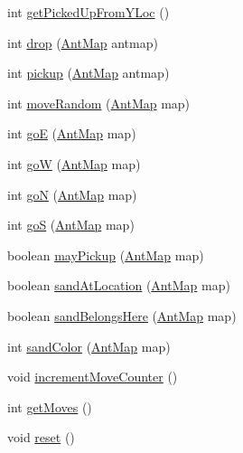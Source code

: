 \begin{DoxyCompactItemize}
\item 
int \hyperlink{classexamples_1_1gp_1_1painted_desert_1_1_ant_aca2e78e0b9846985835404ab3ad76653}{get\-Picked\-Up\-From\-Y\-Loc} ()
\item 
int \hyperlink{classexamples_1_1gp_1_1painted_desert_1_1_ant_aff7748f049d5da568009360f8d5aeb68}{drop} (\hyperlink{classexamples_1_1gp_1_1painted_desert_1_1_ant_map}{Ant\-Map} antmap)
\item 
int \hyperlink{classexamples_1_1gp_1_1painted_desert_1_1_ant_a7db26d98245bc1fb086981b00fe26a2f}{pickup} (\hyperlink{classexamples_1_1gp_1_1painted_desert_1_1_ant_map}{Ant\-Map} antmap)
\item 
int \hyperlink{classexamples_1_1gp_1_1painted_desert_1_1_ant_a489ccb7a59799176ab2ff45184f68092}{move\-Random} (\hyperlink{classexamples_1_1gp_1_1painted_desert_1_1_ant_map}{Ant\-Map} map)
\item 
int \hyperlink{classexamples_1_1gp_1_1painted_desert_1_1_ant_ad2991e6fb21e8cccca0725305ef2d894}{go\-E} (\hyperlink{classexamples_1_1gp_1_1painted_desert_1_1_ant_map}{Ant\-Map} map)
\item 
int \hyperlink{classexamples_1_1gp_1_1painted_desert_1_1_ant_a952dab60b5a44cd208b829c313c688e7}{go\-W} (\hyperlink{classexamples_1_1gp_1_1painted_desert_1_1_ant_map}{Ant\-Map} map)
\item 
int \hyperlink{classexamples_1_1gp_1_1painted_desert_1_1_ant_ab2b7be157d48b8a4386dfd9b69e54ffb}{go\-N} (\hyperlink{classexamples_1_1gp_1_1painted_desert_1_1_ant_map}{Ant\-Map} map)
\item 
int \hyperlink{classexamples_1_1gp_1_1painted_desert_1_1_ant_ab65017c2a36842a09bf2ceba456e4f8c}{go\-S} (\hyperlink{classexamples_1_1gp_1_1painted_desert_1_1_ant_map}{Ant\-Map} map)
\item 
boolean \hyperlink{classexamples_1_1gp_1_1painted_desert_1_1_ant_a76294c6abff2c657c487cf0983bdcbd0}{may\-Pickup} (\hyperlink{classexamples_1_1gp_1_1painted_desert_1_1_ant_map}{Ant\-Map} map)
\item 
boolean \hyperlink{classexamples_1_1gp_1_1painted_desert_1_1_ant_a625142e4f5abf2ea9cf1fc885535eb06}{sand\-At\-Location} (\hyperlink{classexamples_1_1gp_1_1painted_desert_1_1_ant_map}{Ant\-Map} map)
\item 
boolean \hyperlink{classexamples_1_1gp_1_1painted_desert_1_1_ant_afc482fddc69e6ab83316b320170437be}{sand\-Belongs\-Here} (\hyperlink{classexamples_1_1gp_1_1painted_desert_1_1_ant_map}{Ant\-Map} map)
\item 
int \hyperlink{classexamples_1_1gp_1_1painted_desert_1_1_ant_a7826f5f1c76c43b52658d1ae73e6979a}{sand\-Color} (\hyperlink{classexamples_1_1gp_1_1painted_desert_1_1_ant_map}{Ant\-Map} map)
\item 
void \hyperlink{classexamples_1_1gp_1_1painted_desert_1_1_ant_a581e31b5c0c8e96e02d9973cf0a01f4c}{increment\-Move\-Counter} ()
\item 
int \hyperlink{classexamples_1_1gp_1_1painted_desert_1_1_ant_a97e8bbcec25ff2da188e53678970f71e}{get\-Moves} ()
\item 
void \hyperlink{classexamples_1_1gp_1_1painted_desert_1_1_ant_a2a35feb4fa72fe85b685312434b4a623}{reset} ()
\end{DoxyCompactItemize}
